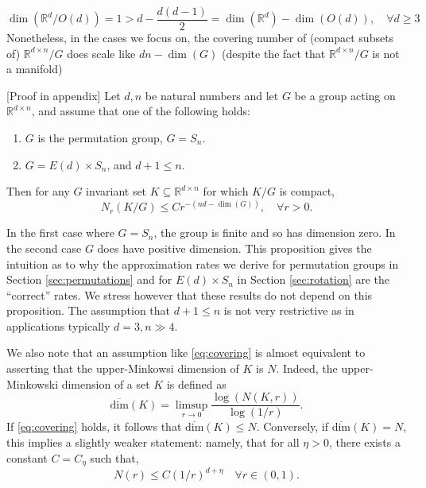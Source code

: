 \documentclass[twoside,11pt]{article}
\newcommand{\RR}{\mathbb{R}}
\newcommand{\dimM}{\overline{\mathrm{dim}}}
\begin{document}
$$\dim(\RR^d/O(d))=1 > d- \frac{d(d-1)}{2}=\dim(\RR^d)-\dim(O(d)), \quad \forall d\geq 3 $$
Nonetheless, in the cases we focus on, the covering number of (compact subsets of) $\RR^{d\times n}/G $ does scale like $dn-\dim(G) $ (despite the fact that $\RR^{d\times n}/G $ is not a manifold)

\begin{prop}\label{prop:dim}[Proof in appendix]
Let  $d,n$ be natural numbers and let $G$ be a group acting on $\RR^{d\times n}$, and assume that one of the  following holds:
\begin{enumerate}
\item $G$ is the permutation group, $G=S_n$.
\item  $G=E(d)\times S_n $, and $d+1\leq n$.
\end{enumerate}
Then for any $G$ invariant set $K\subseteq \RR^{d\times n}$ for which $K/G$ is compact, 
$$N_r(K/G)\leq Cr^{-(nd-\dim(G))}, \quad \forall r>0.$$
\end{prop}
In the first case where $G=S_n$, the group is finite and so has dimension zero. In the second case $G$ does have positive dimension. 
This proposition gives the intuition as to why the approximation rates we derive for permutation groups in Section \ref{sec:permutations} and  for $E(d)\times S_n$ in Section \ref{sec:rotation} are the ``correct'' rates. We stress however that these results do not depend on this proposition. The assumption that $d+1\leq n$
is not very restrictive as in applications typically $d=3, n\gg 4$.


We also note that an assumption like \eqref{eq:covering} is almost equivalent to asserting that the upper-Minkowsi dimension of $K$ is $N$. Indeed, the  upper-Minkowski dimension of a set $K$ is defined as 
$$\dimM\left(K \right)=\limsup_{r\rightarrow 0} \frac{\log(N(K,r))}{\log(1/r)} .$$
If \eqref{eq:covering} holds, it follows that $\dimM\left(K \right)\leq N $. Conversely, if 
$\dimM\left(K\right)=N $, this implies a slightly weaker statement: namely, that for all $\eta>0$, there exists a constant $C=C_\eta$ such that,
\begin{equation}\label{eq:minkowski}
N(r)\leq C(1/r)^{d+\eta} \quad \forall r\in (0,1). 
\end{equation}
\end{document}
